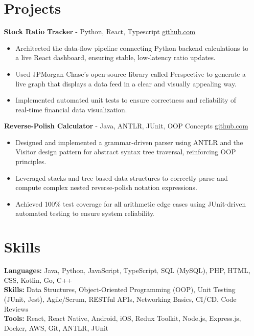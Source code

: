 \documentclass[11pt]{article}       %
\begin{document}
\vspace{-18.5pt}

\section*{Projects}

\textbf{Stock Ratio Tracker}{ - Python, React, Typescript} \hfill \href{https://github.com/Monica20030707/tradingDashboard-UI}{github.com} \\
\vspace{-9pt}
\begin{itemize}
  \item Architected the data-flow pipeline connecting Python backend calculations to a live React dashboard, ensuring stable, low-latency ratio updates. 
  \item Used JPMorgan Chase’s open-source library called Perspective to generate a live graph that displays a data feed in a clear and visually appealing way.
  \item Implemented automated unit tests to ensure correctness and reliability of real-time financial data visualization.
\end{itemize}

\textbf{Reverse-Polish Calculator}{ - Java, ANTLR, JUnit, OOP Concepts} \hfill \href{https://github.com/Monica20030707/reverse-Polish_calculator}{github.com} \\
\vspace{-9pt}
\begin{itemize}
  \item Designed and implemented a grammar-driven parser using ANTLR and the Visitor design pattern for abstract syntax tree traversal, reinforcing OOP principles.
  \item Leveraged stacks and tree-based data structures to correctly parse and compute complex nested reverse-polish notation expressions.
  \item Achieved 100\% test coverage for all arithmetic edge cases using JUnit-driven automated testing to ensure system reliability.
\end{itemize}

\vspace{-18.5pt}

\section*{Skills}
\textbf{Languages:} Java, Python, JavaScript, TypeScript, SQL (MySQL), PHP, HTML, CSS, Kotlin, Go, C++\\
\textbf{Skills:} Data Structures, Object-Oriented Programming (OOP), Unit Testing (JUnit, Jest), Agile/Scrum, RESTful APIs, Networking Basics, CI/CD, Code Reviews\\
\textbf{Tools:} React, React Native, Android, iOS, Redux Toolkit, Node.js, Express.js, Docker, AWS, Git, ANTLR, JUnit\\

\vspace{-6.5pt}
\end{document}
